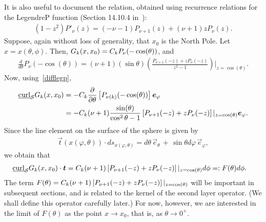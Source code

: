It is also useful to document the relation, obtained using recurrence
relations for the LegendreP function (Section 14.10.4
in~\cite{fatAbramowitz}):
\begin{align*} 
  (1-z^2) P'_\nu(z) = (-\nu-1) P_{\nu+1}(z) + (\nu+1)z P_\nu(z).
\end{align*}
Suppose, again without loss of generality, that $x_0$ is the North Pole.
Let $x=x(\theta,\phi)$. Then, $G_k(x,x_0) = C_k P_\nu(-\cos(\theta))$,
and
\begin{align}
  \label{difflegp} 
  \frac{d}{d\theta} P_\nu(-\cos(\theta)) =  
    (\nu+1)(\sin\theta) \left( \frac{ P_{\nu+1}(-z) +z
        P_{\nu}(-z)}{z^2-1} 
   \right)\vert_{z=\cos(\theta)}.
\end{align}
Now, using~\eqref{difflegp}, 
\begin{align*}
  \underline{\mbox{curl}}_{\S} G_k(x,x_0)&=-
  \C\frac{\partial}{\partial \theta} \left[P_{\nu(k)}(-\cos(\theta))
  \right] \vec{e}_\varphi \\
  &=-\C(\nu+1)\frac{\sin(\theta)}{\cos^2\theta -1} 
    \left[ P_{\nu+1}(-z) + 
   z 
    P_\nu(-z)\right]\vert_{z=\cos(\theta)} \vec{e}_\varphi. \\
\end{align*}
Since the line element on the surface of the sphere is given by
\begin{align*}
  \vec{t}(x(\varphi,\theta))\cdot ds_{x(\varphi,\theta)} = 
    d\theta\,\vec{e}_{\theta} \,+
    \, \sin\theta d\varphi \,\vec{e}_{\varphi}, 
\end{align*} 
we obtain that
\begin{align}
  \label{curlT}
  \underline{\mbox{curl}}_{\S} G_k(x,x_0)\cdot \vec{t} &= 
  \C (\nu+1)  \left[ P_{\nu+1}(-z) + 
  z P_\nu(-z)\right]\vert_{z=\cos(\theta)} d\phi =: F(\theta)d\phi.
\end{align}
The term $F(\theta)= C_k (\nu+1)  \left[ P_{\nu+1}(-z) + z
P_\nu(-z)\right]\vert_{z=\cos(\theta)}$ will be important in subsequent
sections, and is related to the kernel of the second layer operator.
(We shall define this operator carefully later.) For now, however, we
are interested in the limit of $F(\theta)$ as the point $x\rightarrow
x_0$, that is, as $\theta \rightarrow 0^+$.  

